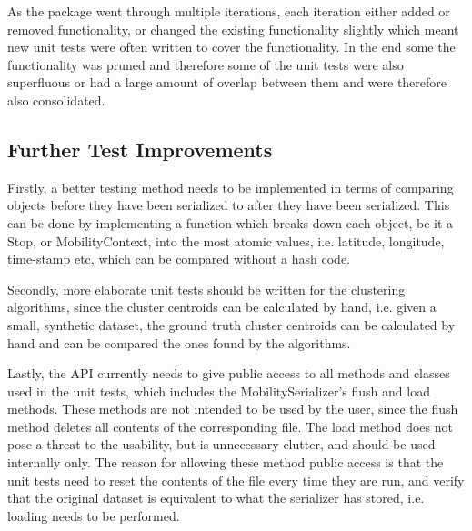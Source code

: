 As the package went through multiple iterations, each iteration either added or removed functionality, or changed the existing functionality slightly which meant new unit tests were often written to cover the functionality. In the end some the functionality was pruned and therefore some of the unit tests were also superfluous or had a large amount of overlap between them and were therefore also consolidated. 

\subsection{Further Test Improvements}
Firstly, a better testing method needs to be implemented in terms of comparing objects before they have been serialized to after they have been serialized. This can be done by implementing a function which breaks down each object, be it a Stop, or MobilityContext, into the most atomic values, i.e. latitude, longitude, time-stamp etc, which can be compared without a hash code.

Secondly, more elaborate unit tests should be written for the clustering algorithms, since the cluster centroids can be calculated by hand, i.e. given a small, synthetic dataset, the ground truth cluster centroids can be calculated by hand and can be compared the ones found by the algorithms.

Lastly, the API currently needs to give public access to all methods and classes used in the unit tests, which includes the MobilitySerializer's flush and load methods. These methods are not intended to be used by the user, since the flush method deletes all contents of the corresponding file. The load method does not pose a threat to the usability, but is unnecessary clutter, and should be used internally only. The reason for allowing these method public access is that the unit tests need to reset the contents of the file every time they are run, and verify that the original dataset is equivalent to what the serializer has stored, i.e. loading needs to be performed.

